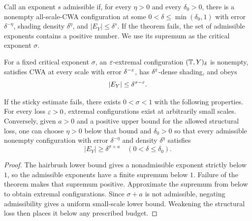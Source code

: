 Call an exponent $s$ admissible if, for every $\eta>0$ and every
$\delta_0>0$, there is a nonempty all-scale-CWA configuration at some
$0<\delta\leq\min(\delta_0,1)$ with error $\delta^{-\eta}$, shading
density $\delta^\eta$, and $|E_Y|\leq\delta^s$. If the theorem fails,
the set of admissible exponents contains a positive number. We use its
supremum as the critical exponent $\sigma$.

\begin{definition}
\label{def:extremal}
\leanok
{}
For a fixed critical exponent $\sigma$, an $\varepsilon$-extremal
configuration $(\mathbb{T},Y)_\delta$ is nonempty, satisfies CWA at every scale
with error $\delta^{-\varepsilon}$, has $\delta^\varepsilon$-dense shading, and obeys
\[
                      |E_Y|\leq\delta^{\sigma-\varepsilon}.
\]
\end{definition}

\begin{lemma}
\label{lem:critical-exponent}
\leanok
{}
If the sticky estimate fails, there exists $0<\sigma<1$ with the
following properties. For every loss $\varepsilon>0$, extremal
configurations exist at arbitrarily small scales. Conversely, given
$a>0$ and a positive upper bound for the allowed structural loss,
one can choose $\eta>0$ below that bound and $\delta_0>0$ so that
every admissible nonempty configuration with error $\delta^{-\eta}$
and density $\delta^\eta$ satisfies
\[
                         |E_Y|\geq\delta^{\sigma+a}
                         \quad(0<\delta\leq\delta_0).
\]
\end{lemma}
\begin{proof}
\leanok
The hairbrush lower bound gives a nonadmissible exponent strictly below
$1$, so the admissible exponents have a finite supremum below $1$.
Failure of the theorem makes that supremum positive. Approximate the
supremum from below to obtain extremal configurations. Since
$\sigma+a$ is not admissible, negating admissibility gives a uniform
small-scale lower bound. Weakening the structural loss then places it
below any prescribed budget.
\end{proof}

